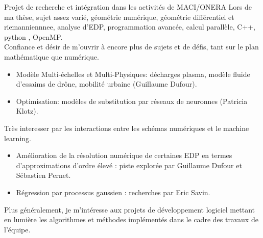 \documentclass[compress,10pt,aspectratio=169]{beamer}
\begin{document}
\begin{frame}{\large Projet de recherche et intégration dans les activités de MACI/ONERA}
\small
\vspace{-0.18cm}
Lors de ma thèse, sujet assez varié, géométrie numérique, géométrie différentiel et riemanniennnee, analyse d'EDP, programmation avancée, calcul parallèle, C++, python , OpenMP.\\
Confiance et désir de m'ouvrir à encore plus de sujets et de défis, tant sur le plan mathématique que numérique.\\\vspace{0.1cm}
\begin{itemize}
\item {\color{onera} Modèle Multi-échelles et Multi-Physiques:} décharges plasma, modèle fluide d'essaims de drône, mobilité urbaine (Guillaume Dufour).\\\vspace{0.1cm}
\item {\color{onera} Optimisation:} modèles de substitution par réseaux de neuronnes (Patricia Klotz).\\\vspace{0.1cm}
\end{itemize}
Très interesser par les interactions entre les schémas numériques et le machine learning.\\\vspace{0.1cm}
\begin{itemize}
\item {\color{onera} Amélioration de la résolution numérique de certaines EDP en termes d’approximations d’ordre élevé :} piste explorée par Guillaume Dufour et Sébastien Pernet.\\\vspace{0.1cm}
\item {\color{onera} Régression par processus gaussien :} recherches par Eric Savin.\\\vspace{0.1cm}
\end{itemize}
Plus généralement, je m'intéresse aux projets de développement logiciel mettant en lumière les algorithmes et méthodes implémentés dans le cadre des travaux de l'équipe.\\\vspace{0.1cm}
\end{frame}
\end{document}
